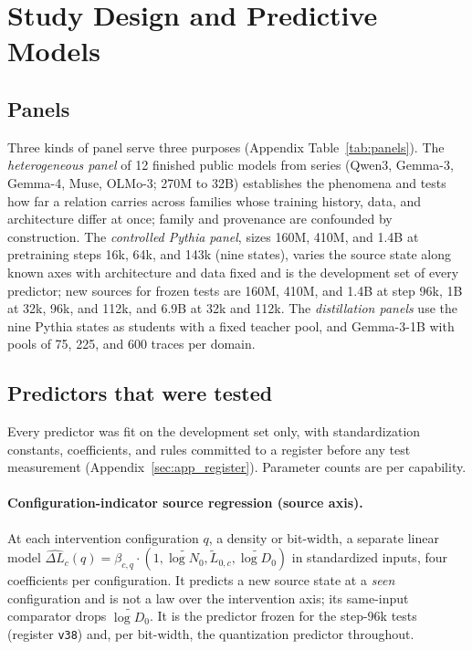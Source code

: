 \section{Study Design and Predictive Models}
\label{sec:method}

\subsection{Panels}
\label{sec:panels}

Three kinds of panel serve three purposes (Appendix
Table~\ref{tab:panels}). The \emph{heterogeneous panel} of 12 finished
public models from \nSeries{} series (Qwen3, Gemma-3, Gemma-4, Muse,
OLMo-3; 270M to 32B) establishes the phenomena and tests how far a
relation carries across families whose training history, data, and
architecture differ at once; family and provenance are confounded by
construction. The \emph{controlled Pythia panel}, sizes 160M, 410M,
and 1.4B at pretraining steps 16k, 64k, and 143k (nine states), varies
the source state along known axes with architecture and data fixed and
is the development set of every predictor; new sources for frozen
tests are 160M, 410M, and 1.4B at step 96k, 1B at 32k, 96k, and 112k,
and 6.9B at 32k and 112k. The \emph{distillation panels} use the nine
Pythia states as students with a fixed teacher pool, and Gemma-3-1B
with pools of 75, 225, and 600 traces per domain.

\subsection{Predictors that were tested}
\label{sec:predictors}

Every predictor was fit on the development set only, with
standardization constants, coefficients, and rules committed to a
register before any test measurement (Appendix~\ref{sec:app_register}).
Parameter counts are per capability.

\paragraph{Configuration-indicator source regression (source axis).}
At each intervention configuration $q$, a density or bit-width, a
separate linear model
$\widehat{\Delta L}_{c}(q)=\beta_{c,q}\cdot(1,\tilde{\log N_0},\tilde L_{0,c},\tilde{\log D_0})$
in standardized inputs, four coefficients per configuration. It
predicts a new source state at a \emph{seen} configuration and is not
a law over the intervention axis; its same-input comparator drops
$\tilde{\log D_0}$. It is the predictor frozen for the step-96k tests
(register \texttt{v38}) and, per bit-width, the quantization predictor
throughout.

